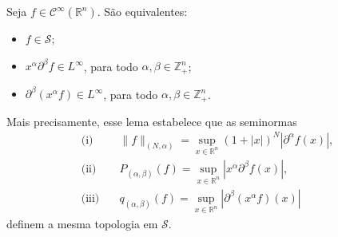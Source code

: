 \documentclass[../distribution_theory_notes.tex]{subfiles}
\begin{document}
\begin{lemma*}
	Seja \(f\in \mathcal{C}^{\infty}(\mathbb{R}^{n})\). São equivalentes:
	\begin{itemize}
		\item[(i)] \(f\in \mathcal{S}\);
		\item[(ii)] \(x^{\alpha }\partial ^{\beta }f\in L^{\infty}\), para todo \(\alpha ,\beta \in \mathbb{Z}_{+}^{n}\);
		\item[(iii)] \(\partial ^{\beta }(x^{\alpha }f)\in L^{\infty}\), para todo \(\alpha ,\beta \in \mathbb{Z}_{+}^{n}\).
	\end{itemize}
\end{lemma*}
\begin{tcolorbox}[
		skin=enhanced,
		title=Observação,
		fonttitle=\bfseries,
		colframe=black,
		colbacktitle=cyan!75!white,
		colback=cyan!15,
		colbacklower=black,
		coltitle=black,
		drop fuzzy shadow
	]
	Mais precisamente, esse lema estabelece que as seminormas
	\begin{align*}
		\text{(i)}\quad   & \|f\|_{(N,\alpha )}=\sup_{x\in \mathbb{R}^{n}}(1+|x|)^{N}|\partial ^{\alpha }f(x)|,     \\
		\text{(ii)}\quad  & P_{(\alpha ,\beta )}(f)=\sup_{x\in \mathbb{R}^{n}}|x^{\alpha }\partial ^{\beta }f(x)|,  \\
		\text{(iii)}\quad & q_{(\alpha ,\beta )}(f)=\sup_{x\in \mathbb{R}^{n}}|\partial ^{\beta }(x^{\alpha }f)(x)|
	\end{align*}
	definem a mesma topologia em \(\mathcal{S}\).
\end{tcolorbox}
\end{document}
